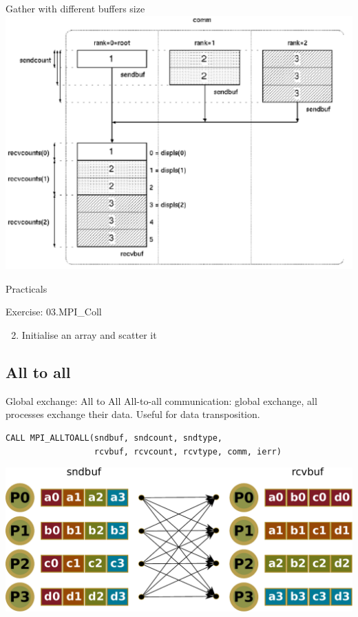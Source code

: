 \documentclass[aspectratio=43]{beamer}
\begin{document}
\begin{frame}{Gather with different buffers size}
\includegraphics[scale=0.5]{03.MPI_Coll/gather2.pdf}
\end{frame}

\begin{frame}{Practicals}
    \begin{brown2block}{Exercise: 03.MPI\_Coll}
    \begin{enumerate}
        \setcounter{enumi}{1}
        \item Initialise an array and scatter it
    \end{enumerate}
    \end{brown2block}
\end{frame}


\subsection{All to all}
\begin{frame}[fragile]{Global exchange: All to All}
All-to-all communication: global exchange, all processes exchange their data. Useful for data transposition.\\
\vspace{-0.2cm}
\footnotesize
\begin{verbatim}
CALL MPI_ALLTOALL(sndbuf, sndcount, sndtype,
                  rcvbuf, rcvcount, rcvtype, comm, ierr)
\end{verbatim}
\normalsize
\begin{center}
\includegraphics[scale=0.5]{03.MPI_Coll/alltoall.pdf}
\end{center}
\end{frame}
\end{document}
